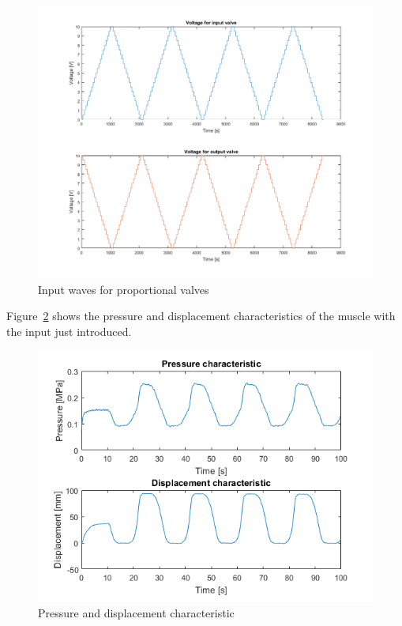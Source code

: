 \begin{figure}[h]
	\centering
	\includegraphics[width=\linewidth]{"Images/stair_input_waves"}
	\caption[Input waves for proportional valves]{Input waves for proportional valves}
	\label{fig:input_voltage}
\end{figure}

Figure~\ref{fig:disp_press} shows the pressure and displacement characteristics
of the muscle with the input just introduced.


\begin{figure}[H]
	\centering
	\includegraphics[width=\linewidth]{"Images/pressure_displacement"}
	\caption[Pressure and displacement characteristic]{Pressure and displacement characteristic}
	\label{fig:disp_press}
\end{figure}

